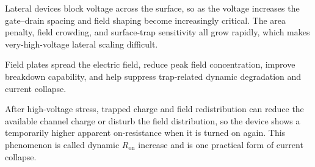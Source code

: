 \begin{solutionblock}
    Lateral devices block voltage across the surface, so as the voltage increases the gate--drain spacing and field shaping become increasingly critical. The area penalty, field crowding, and surface-trap sensitivity all grow rapidly, which makes very-high-voltage lateral scaling difficult.
\end{solutionblock}

\begin{solutionblock}
    Field plates spread the electric field, reduce peak field concentration, improve breakdown capability, and help suppress trap-related dynamic degradation and current collapse.
\end{solutionblock}

\begin{solutionblock}
    After high-voltage stress, trapped charge and field redistribution can reduce the available channel charge or disturb the field distribution, so the device shows a temporarily higher apparent on-resistance when it is turned on again. This phenomenon is called dynamic $R_{\mathrm{on}}$ increase and is one practical form of current collapse.
\end{solutionblock}

